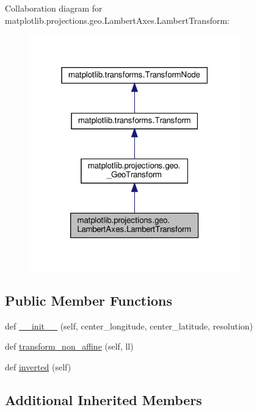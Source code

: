 Collaboration diagram for matplotlib.\+projections.\+geo.\+Lambert\+Axes.\+Lambert\+Transform\+:
\nopagebreak
\begin{figure}[H]
\begin{center}
\leavevmode
\includegraphics[width=259pt]{classmatplotlib_1_1projections_1_1geo_1_1LambertAxes_1_1LambertTransform__coll__graph}
\end{center}
\end{figure}
\subsection*{Public Member Functions}
\begin{DoxyCompactItemize}
\item 
def \hyperlink{classmatplotlib_1_1projections_1_1geo_1_1LambertAxes_1_1LambertTransform_af7a6def533e2ffe2d9b592419a1ae042}{\+\_\+\+\_\+init\+\_\+\+\_\+} (self, center\+\_\+longitude, center\+\_\+latitude, resolution)
\item 
def \hyperlink{classmatplotlib_1_1projections_1_1geo_1_1LambertAxes_1_1LambertTransform_a73e8a6eea9e75dedbc1b86837e37bd56}{transform\+\_\+non\+\_\+affine} (self, ll)
\item 
def \hyperlink{classmatplotlib_1_1projections_1_1geo_1_1LambertAxes_1_1LambertTransform_a089b1f1f7c6f82db606c28818dbe11ba}{inverted} (self)
\end{DoxyCompactItemize}
\subsection*{Additional Inherited Members}


